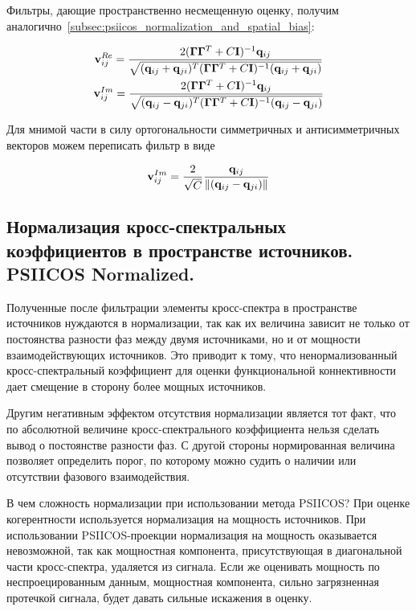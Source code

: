 Фильтры, дающие пространственно несмещенную оценку, получим аналогично~\ref{subsec:psiicos_normalization_and_spatial_bias}:

\begin{gather}
    \mathbf{v}_{ij}^{Re} = \frac{2(\mathbf{\Gamma}\mathbf{\Gamma}^T + C\mathbf{I})^{-1}\mathbf{q}_{ij}}
    {\sqrt{(\mathbf{q}_{ij} + \mathbf{q}_{ji})^T(\mathbf{\Gamma}\mathbf{\Gamma}^T + C\mathbf{I})^{-1}(\mathbf{q}_{ij} + \mathbf{q}_{ji})}}\\
    \mathbf{v}_{ij}^{Im} = \frac{2(\mathbf{\Gamma}\mathbf{\Gamma}^T + C\mathbf{I})^{-1}\mathbf{q}_{ij}}
    {\sqrt{(\mathbf{q}_{ij} - \mathbf{q}_{ji})^T(\mathbf{\Gamma}\mathbf{\Gamma}^T + C\mathbf{I})^{-1}(\mathbf{q}_{ij} - \mathbf{q}_{ji})}}
\end{gather}

Для мнимой части в силу ортогональности симметричных и антисимметричных векторов можем переписать фильтр в виде

\begin{equation}
    \mathbf{v}_{ij}^{Im} = \frac{2}{\sqrt{C}} \frac{\mathbf{q}_{ij}}{\left\lVert(\mathbf{q}_{ij} - \mathbf{q}_{ji})\right\rVert}
\end{equation}

\subsection{Нормализация кросс-спектральных коэффициентов в пространстве источников. PSIICOS Normalized.}\label{subsec:psiicos_normalized}

Полученные после фильтрации элементы кросс-спектра в пространстве источников нуждаются
в нормализации, так как их величина зависит не только от постоянства разности фаз между
двумя источниками, но и от мощности взаимодействующих источников. Это приводит к тому, что ненормализованный
кросс-спектральный коэффициент для оценки функциональной коннективности дает смещение
в сторону более мощных источников.

Другим негативным эффектом отсутствия нормализации является тот факт, что
по абсолютной величине кросс-спектрального коэффициента нельзя сделать вывод
о постоянстве разности фаз. С другой стороны нормированная величина позволяет
определить порог, по которому можно судить о наличии или отсутствии фазового взаимодействия.

В чем сложность нормализации при использовании метода PSIICOS?\@
При оценке когерентности используется нормализация на мощность источников. При
использовании PSIICOS-проекции нормализация на мощность оказывается
невозможной, так как мощностная компонента, присутствующая в диагональной части
кросс-спектра, удаляется из сигнала. Если же оценивать мощность по неспроецированным
данным, мощностная компонента, сильно загрязненная протечкой сигнала, будет
давать сильные искажения в оценку.

